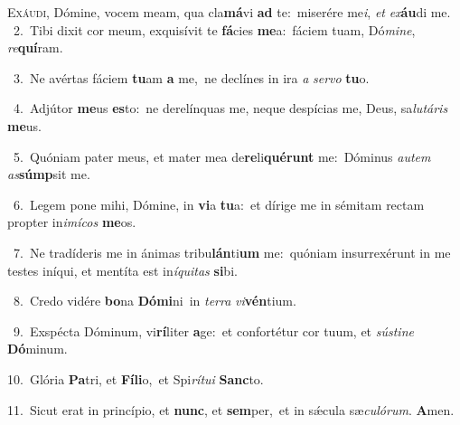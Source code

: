 \lettrine{\initial\textcolor{\initialcolor}{E}}{xáudi,} Dómine, vocem meam, qua cla\-\textbf{má}\-vi \textbf{ad} te:~\star miserére me\-\textit{i}\-, \textit{et} \textit{ex}\-\textbf{áu}di me.\\
{\numbfont\textcolor{\numbcolor}{~2.}}~Tibi dixit cor meum, exquisívit te \textbf{fá}\-cies \textbf{me}\-a:~\star fáciem tuam, Dó\-\textit{mi}\-\textit{ne}, \textit{re}\-\textbf{quí}ram.\par
{\numbfont\textcolor{\numbcolor}{~3.}}~Ne avértas fáciem \textbf{tu}\-am \textbf{a} me,~\star ne declínes in ira \textit{a} \textit{ser}\-\textit{vo} \textbf{tu}\-o.\par
{\numbfont\textcolor{\numbcolor}{~4.}}~Adjútor \textbf{me}\-us \textbf{es}\-to:~\star ne derelínquas me, neque despícias me, Deus, sa\-\textit{lu}\-\textit{tá}\textit{ris} \textbf{me}\-us.\par
{\numbfont\textcolor{\numbcolor}{~5.}}~Quóniam pater meus, et mater mea de\-\textbf{re}\-li\-\textbf{qué}\-\textbf{runt} me:~\star Dóminus \textit{au}\-\textit{tem} \textit{as}\-\textbf{súmp}sit me.\par
{\numbfont\textcolor{\numbcolor}{~6.}}~Legem pone mihi, Dómine, in \textbf{vi}\-a \textbf{tu}\-a:~\star et dírige me in sémitam rectam propter in\-\textit{i}\-\textit{mí}\textit{cos} \textbf{me}\-os.\par
{\numbfont\textcolor{\numbcolor}{~7.}}~Ne tradíderis me in ánimas tribu\-\textbf{lán}\-ti\textbf{um} me:~\star quóniam insurrexérunt in me testes iníqui, et mentíta est in\-\textit{í}\-\textit{qui}\textit{tas} \textbf{si}\-bi.\par
{\numbfont\textcolor{\numbcolor}{~8.}}~Credo vidére \textbf{bo}\-na \textbf{Dó}\-\textbf{mi}ni~\star in \textit{ter}\-\textit{ra} \textit{vi}\-\textbf{vén}tium.\par
{\numbfont\textcolor{\numbcolor}{~9.}}~Exspécta Dóminum, vi\-\textbf{rí}\-liter \textbf{a}\-ge:~\star et confortétur cor tuum, et \textit{sús}\-\textit{ti}\textit{ne} \textbf{Dó}\-minum.\par
{\numbfont\textcolor{\numbcolor}{10.}}~Glória \textbf{Pa}\-tri, et \textbf{Fí}\-\textbf{li}o,~\star et Spi\-\textit{rí}\-\textit{tu}\textit{i} \textbf{Sanc}\-to.\par
{\numbfont\textcolor{\numbcolor}{11.}}~Sicut erat in princípio, et \textbf{nunc}\-, et \textbf{sem}\-per,~\star et in sǽcula sæ\-\textit{cu}\-\textit{ló}\textit{rum}. \textbf{A}\-men.\par
